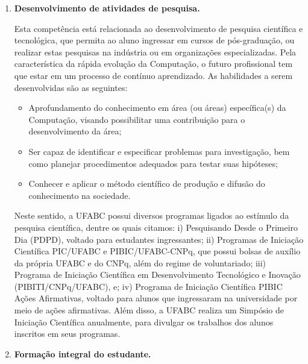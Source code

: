 \begin{enumerate}
    \item \textbf{Desenvolvimento de atividades de pesquisa.}

    Esta competência está relacionada ao desenvolvimento de pesquisa científica
    e tecnológica, que permita ao aluno ingressar em cursos de pós-graduação,
    ou realizar estas pesquisas na indústria ou em organizações especializadas.
    Pela característica da rápida evolução da Computação, o futuro profissional
    tem que estar em um processo de contínuo aprendizado. 
    As habilidades a serem desenvolvidas são as seguintes:
    \begin{itemize}
        \item Aprofundamento do conhecimento em área (ou áreas) específica(s)
        da Computação, visando possibilitar uma contribuição para o
        desenvolvimento da área;
        \item Ser capaz de identificar e especificar problemas para
        investigação, bem como planejar procedimentos adequados para testar
        suas hipóteses; 
        \item Conhecer e aplicar o método científico de produção e difusão do
        conhecimento na sociedade.
    \end{itemize}

    Neste sentido, a UFABC possui diversos programas ligados ao estímulo da
    pesquisa científica, dentre os quais citamos: i) Pesquisando Desde o
    Primeiro Dia (PDPD), voltado para estudantes ingressantes; ii) Programas de
    Iniciação Científica PIC/UFABC e PIBIC/UFABC-CNPq, que possui bolsas de
    auxílio da própria UFABC e do CNPq, além do regime de voluntariado; iii)
    Programa de Iniciação Científica em Desenvolvimento Tecnológico e Inovação
    (PIBITI/CNPq/UFABC), e; iv) Programa de Iniciação Científica PIBIC Ações
    Afirmativas, voltado para alunos que ingressaram na universidade por meio
    de ações afirmativas.
    Além disso, a UFABC realiza um Simpósio de Iniciação Científica anualmente,
    para divulgar os trabalhos dos alunos inscritos em seus programas.

    \item \textbf{Formação integral do estudante.}


\end{enumerate}
